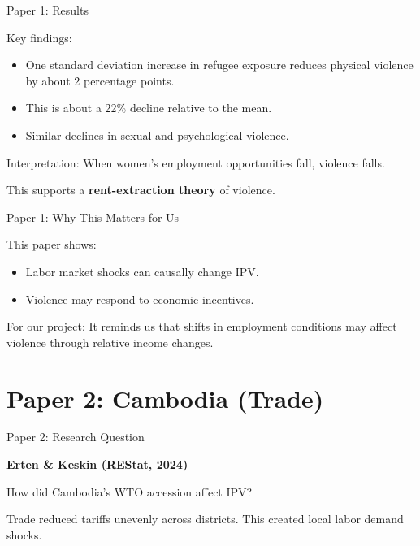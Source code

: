 \documentclass[11pt,aspectratio=169]{beamer}
\begin{document}
\begin{frame}{Paper 1: Results}

Key findings:

\begin{itemize}
    \item One standard deviation increase in refugee exposure
    reduces physical violence by about 2 percentage points.
    \item This is about a 22\% decline relative to the mean.
    \item Similar declines in sexual and psychological violence.
\end{itemize}

\medskip

Interpretation:
When women’s employment opportunities fall,
violence falls.

This supports a \textbf{rent-extraction theory} of violence.

\end{frame}

\begin{frame}{Paper 1: Why This Matters for Us}

This paper shows:

\begin{itemize}
    \item Labor market shocks can causally change IPV.
    \item Violence may respond to economic incentives.
\end{itemize}

For our project:
It reminds us that shifts in employment conditions
may affect violence through relative income changes.

\end{frame}

\section{Paper 2: Cambodia (Trade)}

\begin{frame}{Paper 2: Research Question}

\textbf{Erten \& Keskin (REStat, 2024)}

\medskip

How did Cambodia’s WTO accession affect IPV?

\medskip

Trade reduced tariffs unevenly across districts.
This created local labor demand shocks.

\end{frame}
\end{document}
